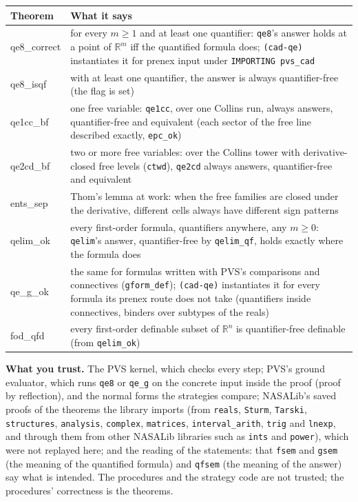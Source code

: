 \documentclass[11pt]{article}
\begin{document}
{\small
\begin{longtable}{@{}>{\ttfamily}p{} p{}@{}}
\toprule
\textsf{\small\bfseries Theorem} & \textsf{\small\bfseries What it says}\\
\midrule
qe8\_correct & for every $m\ge1$ and at least one quantifier: \texttt{qe8}'s answer holds at a point of $\mathbb{R}^m$ iff the quantified formula does; \texttt{(cad-qe)} instantiates it for prenex input under \texttt{IMPORTING pvs\_cad}\\
qe8\_isqf & with at least one quantifier, the answer is always quantifier-free (the flag is set)\\
qe1cc\_bf & one free variable: \texttt{qe1cc}, over one Collins run, always answers, quantifier-free and equivalent (each sector of the free line described exactly, \texttt{epc\_ok})\\
qe2cd\_bf & two or more free variables: over the Collins tower with derivative-closed free levels (\texttt{ctwd}), \texttt{qe2cd} always answers, quantifier-free and equivalent\\
ents\_sep & Thom's lemma at work: when the free families are closed under the derivative, different cells always have different sign patterns\\
qelim\_ok & every first-order formula, quantifiers anywhere, any $m \ge 0$: \texttt{qelim}'s answer, quantifier-free by \texttt{qelim\_qf}, holds exactly where the formula does\\
qe\_g\_ok & the same for formulas written with PVS's comparisons and connectives (\texttt{gform\_def}); \texttt{(cad-qe)} instantiates it for every formula its prenex route does not take (quantifiers inside connectives, binders over subtypes of the reals)\\
fod\_qfd & every first-order definable subset of $\mathbb{R}^n$ is quantifier-free definable (from \texttt{qelim\_ok})\\
\bottomrule
\end{longtable}}

\textbf{What you trust.} The PVS kernel, which checks every step; PVS's ground evaluator, which runs \texttt{qe8}
or \texttt{qe\_g} on the concrete input inside the proof (proof by reflection), and the normal forms the
strategies compare; NASALib's saved proofs
of the theorems the library imports (from \texttt{reals}, \texttt{Sturm}, \texttt{Tarski}, \texttt{structures},
\texttt{analysis}, \texttt{complex}, \texttt{matrices}, \texttt{interval\_arith},
\texttt{trig} and \texttt{lnexp}, and through them from other NASALib libraries such as \texttt{ints} and
\texttt{power}), which were not
replayed here; and the reading of the statements: that \texttt{fsem} and \texttt{gsem} (the meaning of
the quantified formula) and \texttt{qfsem} (the meaning of the answer) say what is intended. The procedures and
the strategy code are not trusted; the procedures' correctness is the theorems.
\end{document}
